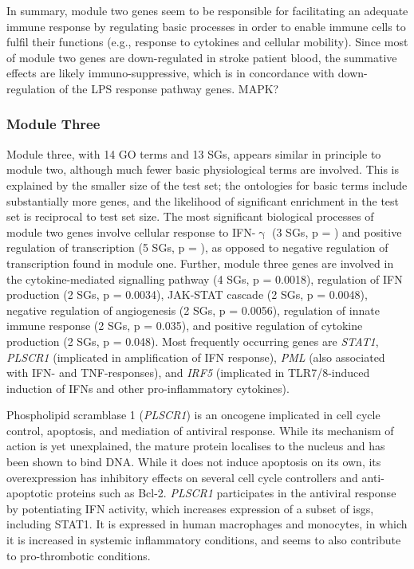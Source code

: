 In summary, module two genes seem to be responsible for facilitating an adequate immune response by regulating basic processes in order to enable immune cells to fulfil their functions (e.g., response to cytokines and cellular mobility). Since most of module two genes are down-regulated in stroke patient blood, the summative effects are likely immuno-suppressive, which is in concordance with down-regulation of the LPS response pathway genes. MAPK? \todo{}

\subsubsection{Module Three}
Module three, with 14 GO terms and 13 SGs, appears similar in principle to module two, although much fewer basic physiological terms are involved. This is explained by the smaller size of the test set; the ontologies for basic terms include substantially more genes, and the likelihood of significant enrichment in the test set is reciprocal to test set size. The most significant biological processes of module two genes involve cellular response to IFN-$\upgamma$ (3 SGs, p = ) and positive regulation of transcription (5 SGs, p = ), as opposed to negative regulation of transcription found in module one. Further, module three genes are involved in the cytokine-mediated signalling pathway (4 SGs, p = 0.0018), regulation of IFN production (2 SGs, p = 0.0034), JAK-STAT cascade (2 SGs, p = 0.0048), negative regulation of angiogenesis (2 SGs, p = 0.0056), regulation of innate immune response (2 SGs, p = 0.035), and positive regulation of cytokine production (2 SGs, p = 0.048). Most frequently occurring genes are \emph{STAT1}, \emph{PLSCR1} (implicated in amplification of IFN response), \emph{PML} (also associated with IFN- and TNF-responses), and \emph{IRF5} (implicated in TLR7/8-induced induction of IFNs and other pro-inflammatory cytokines).

Phospholipid scramblase 1 (\emph{PLSCR1}) is an oncogene implicated in cell cycle control, apoptosis, and mediation of antiviral response. While its mechanism of action is yet unexplained, the mature protein localises to the nucleus and has been shown to bind DNA.\cite{Ben-Efraim2004} While it does not induce apoptosis on its own, its overexpression has inhibitory effects on several cell cycle controllers and anti-apoptotic proteins such as Bcl-2.\cite{Huang2006} \emph{PLSCR1} participates in the antiviral response by potentiating IFN activity, which increases expression of a subset of \acp{isg}, including STAT1.\cite{Dong2004} It is expressed in human macrophages and monocytes, in which it is increased in systemic inflammatory conditions, and seems to also contribute to pro-thrombotic conditions.\cite{Suzuki2010,Herate2016} 

